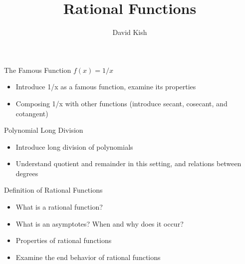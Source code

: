 \documentclass{ximera}
\author{David Kish}
\title{Rational Functions}
\begin{document}
\begin{abstract}
\end{abstract}
\maketitle


\begin{objectives}

\item The Famous Function $f(x)=1/x$
\begin{itemize}
	\item Introduce 1/x as a famous function, examine its properties 
	\item Composing 1/x with other functions (introduce secant, cosecant, and cotangent) 
\end{itemize}

\item Polynomial Long Division
\begin{itemize}
\item Introduce long division of polynomials
\item Understand quotient and remainder in this setting, and relations between degrees
\end{itemize}


\item Definition of Rational Functions
\begin{itemize}
	\item What is a rational function?
	\item What is an asymptotes?  When and why does it occur?
	\item Properties of rational functions
	\item Examine the end behavior of rational functions
\end{itemize}


\end{objectives}
\end{document}
